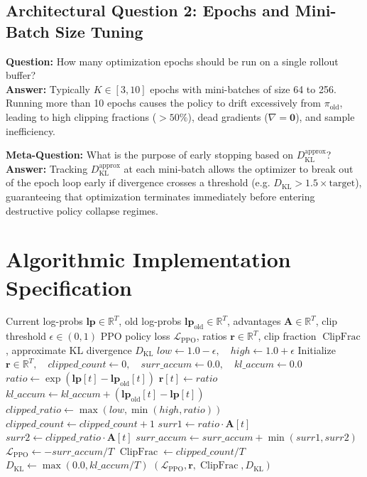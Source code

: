 \documentclass[11pt,a4paper]{article}
\theoremstyle{definition}
\begin{document}
\subsection{Architectural Question 2: Epochs and Mini-Batch Size Tuning}
\textbf{Question:} How many optimization epochs should be run on a single rollout buffer?\\
\textbf{Answer:} Typically $K \in [3, 10]$ epochs with mini-batches of size 64 to 256. Running more than 10 epochs causes the policy to drift excessively from $\pi_{\text{old}}$, leading to high clipping fractions ($>50\%$), dead gradients ($\nabla = \mathbf{0}$), and sample inefficiency.

\textbf{Meta-Question:} What is the purpose of early stopping based on $D_{\text{KL}}^{\text{approx}}$?\\
\textbf{Answer:} Tracking $D_{\text{KL}}^{\text{approx}}$ at each mini-batch allows the optimizer to break out of the epoch loop early if divergence crosses a threshold (e.g. $D_{\text{KL}} > 1.5 \times \text{target}$), guaranteeing that optimization terminates immediately before entering destructive policy collapse regimes.

\section{Algorithmic Implementation Specification}

\begin{algorithm}[H]
\caption{PPO Clipped Surrogate Loss Evaluation and Diagnostic Monitoring}
\begin{algorithmic}[1]
\Require Current log-probs $\mathbf{lp} \in \mathbb{R}^T$, old log-probs $\mathbf{lp}_{\text{old}} \in \mathbb{R}^T$, advantages $\mathbf{A} \in \mathbb{R}^T$, clip threshold $\epsilon \in (0, 1)$
\Ensure PPO policy loss $\mathcal{L}_{\text{PPO}}$, ratios $\mathbf{r} \in \mathbb{R}^T$, clip fraction $\operatorname{ClipFrac}$, approximate KL divergence $D_{\text{KL}}$
\State $low \gets 1.0 - \epsilon, \quad high \gets 1.0 + \epsilon$
\State Initialize $\mathbf{r} \in \mathbb{R}^T, \quad clipped\_count \gets 0, \quad surr\_accum \gets 0.0, \quad kl\_accum \gets 0.0$
    \State $ratio \gets \exp(\mathbf{lp}[t] - \mathbf{lp}_{\text{old}}[t])$
    \State $\mathbf{r}[t] \gets ratio$
    \State $kl\_accum \gets kl\_accum + (\mathbf{lp}_{\text{old}}[t] - \mathbf{lp}[t])$ 
    \State $clipped\_ratio \gets \max(low, \min(high, ratio))$ 
        \State $clipped\_count \gets clipped\_count + 1$
    \EndIf
    \State $surr1 \gets ratio \cdot \mathbf{A}[t]$
    \State $surr2 \gets clipped\_ratio \cdot \mathbf{A}[t]$
    \State $surr\_accum \gets surr\_accum + \min(surr1, surr2)$ 
\EndFor
\State $\mathcal{L}_{\text{PPO}} \gets - surr\_accum / T$
\State $\operatorname{ClipFrac} \gets clipped\_count / T$
\State $D_{\text{KL}} \gets \max(0.0, kl\_accum / T)$
\State \Return $(\mathcal{L}_{\text{PPO}}, \mathbf{r}, \operatorname{ClipFrac}, D_{\text{KL}})$
\end{algorithmic}
\end{algorithm}
\end{document}
